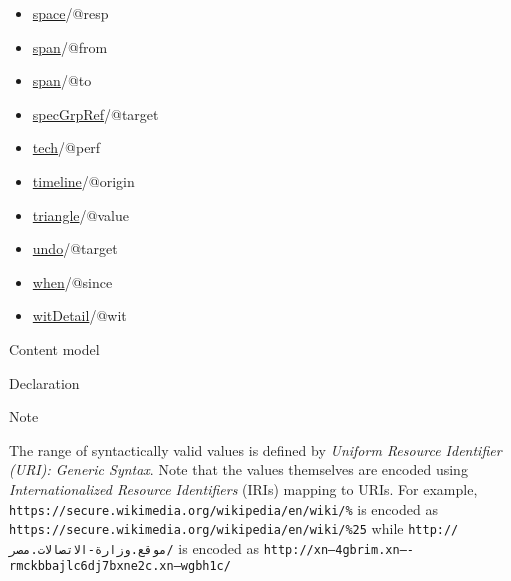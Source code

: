 \begin{reflist}
\begin{itemize}
\item \hyperref[TEI.space]{space}/@resp
\item \hyperref[TEI.span]{span}/@from
\item \hyperref[TEI.span]{span}/@to
\item \hyperref[TEI.specGrpRef]{specGrpRef}/@target
\item \hyperref[TEI.tech]{tech}/@perf
\item \hyperref[TEI.timeline]{timeline}/@origin
\item \hyperref[TEI.triangle]{triangle}/@value
\item \hyperref[TEI.undo]{undo}/@target
\item \hyperref[TEI.when]{when}/@since
\item \hyperref[TEI.witDetail]{witDetail}/@wit
\end{itemize} 
    \item[{Content model}]
    \item[{Declaration}]
    \item[{Note}]
  \par
The range of syntactically valid values is defined by  \textit{Uniform Resource Identifier (URI): Generic Syntax}. Note that the values themselves are encoded using  \textit{Internationalized Resource Identifiers} (IRIs) mapping to URIs. For example, \texttt{https://secure.wikimedia.org/wikipedia/en/wiki/\%} is encoded as \texttt{https://secure.wikimedia.org/wikipedia/en/wiki/\%25} while \texttt{http://موقع.وزارة-الاتصالات.مصر/} is encoded as \texttt{http://xn--4gbrim.xn----rmckbbajlc6dj7bxne2c.xn--wgbh1c/}
\end{reflist}  
